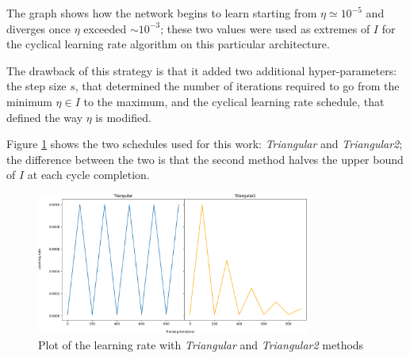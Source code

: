 The graph shows how the network begins to learn starting from $\eta \simeq 10^{-5}$ and diverges once $\eta$ exceeded $\sim10^{-3}$; these two values were used as extremes of $I$ for the cyclical learning rate algorithm on this particular architecture.\par
The drawback of this strategy is that it added two additional hyper-parameters: the step size $s$, that determined the number of iterations required to go from the minimum $\eta \in I$ to the maximum, and the cyclical learning rate schedule, that defined the way $\eta$ is modified. \par

Figure \ref{fig:triangular} shows the two schedules used for this work: \emph{Triangular} and \emph{Triangular2};
the difference between the two is that the second method halves the upper bound of $I$ at each cycle completion.
\begin{figure}[ht!]
\centering
\includegraphics[width=0.8\textwidth]{images/triangular.png} 
\caption{Plot of the learning rate with \emph{Triangular} and \emph{Triangular2} methods}
\label{fig:triangular}
\end{figure}








